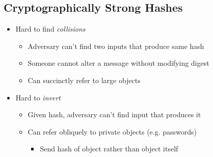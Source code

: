 \subsection{Cryptographically Strong Hashes}
\begin{itemize}[nosep]
    \item Hard to find \emph{collisions}
          \begin{itemize}[nosep]
              \item Adversary can't find two inputs that produce same hash
              \item Someone cannot alter a message without modifying digest
              \item Can succinctly refer to large objects
          \end{itemize}
    \item Hard to \emph{invert}
          \begin{itemize}[nosep]
              \item Given hash, adversary can't find input that produces it
              \item Can refer obliquely to private objects (e.g. passwords)
                    \begin{itemize}[nosep]
                        \item Send hash of object rather than object itself
                    \end{itemize}
          \end{itemize}
\end{itemize}

